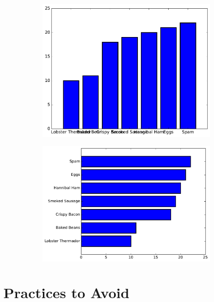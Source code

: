 \begin{figure}[H] %
\centering
\begin{subfigure}{.47\textwidth}
    \centering
    \includegraphics[width=\linewidth]{figures/bar_1.pdf}
\end{subfigure}
%
\begin{subfigure}{.52\textwidth}
    \centering
    \includegraphics[width=\linewidth]{figures/bar_2.pdf}
\end{subfigure}
\end{figure}

\section*{Practices to Avoid} %

